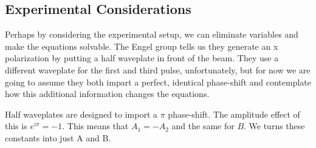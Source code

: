 \subsection{Experimental Considerations}

Perhaps by considering the experimental setup, we can eliminate variables and make the equations solvable.  The Engel group tells us they generate an x polarization by putting a half waveplate in front of the beam.  They use a different waveplate for the first and third pulse, unfortunately, but for now we are going to assume they both impart a perfect, identical phase-shift and  contemplate how this additional information changes the equations.

Half waveplates are designed to import a $\pi$ phase-shift.  The amplitude effect of this is $e^{i \pi} = -1$.  This means that $A_1 = -A_2$ and the same for $B$.  We turns these constants into just A and B.

